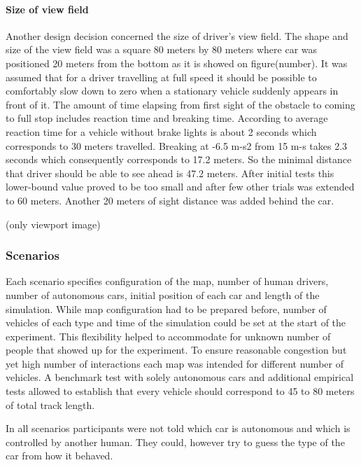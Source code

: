 \documentclass[11pt,english]{article}
\begin{document}
\paragraph{Size of view field}
Another design decision concerned the size of driver's view field. The shape and size of the view field was a square 80 meters by 80 meters where car was positioned 20 meters from the bottom as it is showed on figure(number). It was assumed that for a driver travelling at full speed it should be possible to comfortably slow down to zero when a stationary vehicle suddenly appears in front of it. The amount of time elapsing from first sight of the obstacle to coming to full stop includes reaction time and breaking time. According to \citep{summala1998driving} average reaction time for a vehicle without brake lights is about 2 seconds which corresponds to 30 meters travelled. Breaking at -6.5 m-s2 from 15 m-s takes 2.3 seconds which consequently corresponds to 17.2 meters. So the minimal distance that driver should be able to see ahead is 47.2 meters. After initial tests this lower-bound value proved to be too small and after few other trials was extended to 60 meters. Another 20 meters of sight distance was added behind the car. 

(only viewport image)





\subsubsection{Scenarios}

Each scenario specifies configuration of the map, number of human drivers, number of autonomous cars, initial position of each car and length of the simulation. 
While map configuration had to be prepared before, number of vehicles of each type and time of the simulation could be set at the start of the experiment. This flexibility helped to accommodate for unknown number of people that showed up for the experiment. To ensure reasonable congestion but yet high number of interactions each map was intended for different number of vehicles. A benchmark test with solely autonomous cars and additional empirical tests allowed to establish that every vehicle should correspond to 45 to 80 meters of total track length.


In all scenarios participants were not told which car is autonomous and which is controlled by another human. They could, however try to guess the type of the car from how it behaved. 
\end{document}

